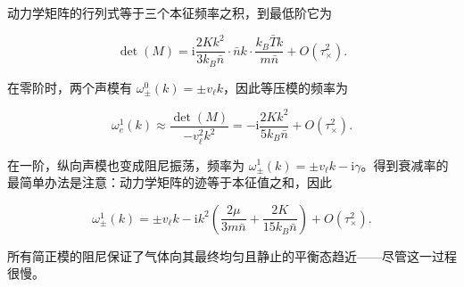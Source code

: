 动力学矩阵的行列式等于三个本征频率之积，到最低阶它为

\begin{equation}\label{eq:3.128}
  \det(M)=\mathrm{i}\frac{2Kk^2}{3k_B\bar n}\cdot\bar nk\cdot\frac{k_B\bar Tk}{m\bar n}+O\left(\tau_\times^2\right).
\end{equation}

在零阶时，两个声模有 $\omega_\pm^0(k)=\pm v_\ell k$，因此等压模的频率为

\begin{equation}\label{eq:3.129}
  \omega_e^1(k)\approx\frac{\det(M)}{-v_\ell^2k^2}=-\mathrm{i}\frac{2Kk^2}{5k_B\bar n}+O\left(\tau_\times^2\right).
\end{equation}

在一阶，纵向声模也变成阻尼振荡，频率为 $\omega_\pm^1(k)=\pm v_\ell k-\mathrm{i}\gamma$。得到衰减率的最简单办法是注意：动力学矩阵的迹等于本征值之和，因此

\begin{equation}\label{eq:3.130}
  \omega_\pm^1(k)=\pm v_\ell k-\mathrm{i}k^2\left(\frac{2\mu}{3m\bar n}+\frac{2K}{15k_B\bar n}\right)+O\left(\tau_\times^2\right).
\end{equation}

所有简正模的阻尼保证了气体向其最终均匀且静止的平衡态趋近——尽管这一过程很慢。

